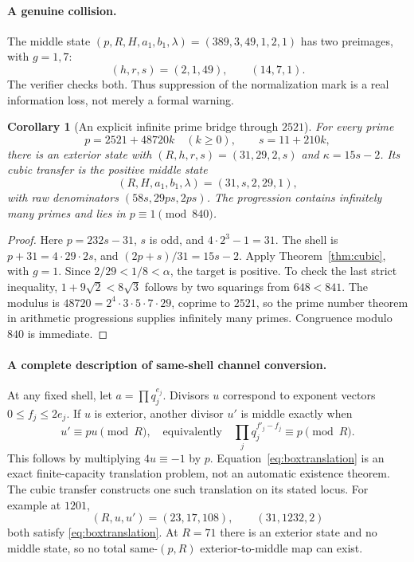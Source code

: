 \documentclass[11pt]{article}
\newtheorem{corollary}[theorem]{Corollary}
\theoremstyle{remark}\newtheorem{remark}[theorem]{Remark}
\begin{document}
\paragraph{A genuine collision.}
The middle state $(p,R,H,a_1,b_1,\lambda)=(389,3,49,1,2,1)$ has two preimages, with $g=1,7$:
\[
 (h,r,s)=(2,1,49),\qquad(14,7,1).
\]
The verifier checks both. Thus suppression of the normalization mark is a real information loss, not merely a formal warning.

\begin{corollary}[An explicit infinite prime bridge through $2521$]\label{cor:bridge}
For every prime
\[
 p=2521+48720k\quad(k\ge0),\qquad s=11+210k,
\]
there is an exterior state with $(R,h,r,s)=(31,29,2,s)$ and $\kappa=15s-2$. Its cubic transfer is the positive middle state
\[
 (R,H,a_1,b_1,\lambda)=(31,s,2,29,1),
\]
with raw denominators $(58s,29ps,2ps)$. The progression contains infinitely many primes and lies in $p\equiv1\pmod{840}$.
\end{corollary}
\begin{proof}
Here $p=232s-31$, $s$ is odd, and $4\cdot2^3-1=31$. The shell is $p+31=4\cdot29\cdot2s$, and
$(2p+s)/31=15s-2$. Apply Theorem~\ref{thm:cubic}, with $g=1$. Since $2/29<1/8<\alpha$, the target is positive. To check the last strict inequality, $1+9\sqrt2<8\sqrt3$ follows by two squarings from $648<841$.
The modulus is $48720=2^4\cdot3\cdot5\cdot7\cdot29$, coprime to $2521$, so the prime number theorem in arithmetic progressions supplies infinitely many primes. Congruence modulo $840$ is immediate.
\end{proof}

\paragraph{A complete description of same-shell channel conversion.}
At any fixed shell, let $a=\prod q_j^{e_j}$. Divisors $u$ correspond to exponent vectors $0\le f_j\le2e_j$. If $u$ is exterior, another divisor $u'$ is middle exactly when
\begin{equation}\label{eq:boxtranslation}
 u'\equiv p u\pmod R,
 \quad\text{equivalently}\quad
 \prod_jq_j^{f'_j-f_j}\equiv p\pmod R.
\end{equation}
This follows by multiplying $4u\equiv-1$ by $p$. Equation~\eqref{eq:boxtranslation} is an exact finite-capacity translation problem, not an automatic existence theorem. The cubic transfer constructs one such translation on its stated locus. For example at $1201$,
\[
 (R,u,u')=(23,17,108),\qquad(31,1232,2)
\]
both satisfy \eqref{eq:boxtranslation}. At $R=71$ there is an exterior state and no middle state, so no total same-$(p,R)$ exterior-to-middle map can exist.
\end{document}
